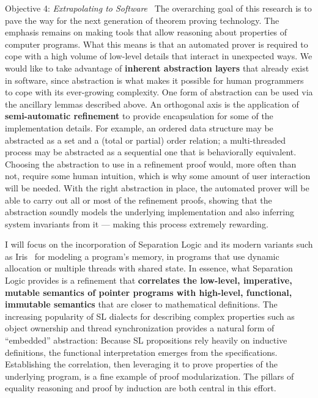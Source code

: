 \begin{paragraph}{Objective 4: {\it Extrapolating to Software}}~
The overarching goal of this research is to pave the way for the next generation of theorem proving technology.
The emphasis remains on making tools that allow reasoning about properties of computer programs.
What this means is that an automated prover is required to cope with a high volume of low-level details that interact in unexpected ways.
We would like to take advantage of \textbf{inherent abstraction layers} that already exist in software,
since abstraction is what makes it possible
for human programmers to cope with its ever-growing complexity.
One form of abstraction can be used via the ancillary lemmas described above.
An orthogonal axis is the application of \textbf{semi-automatic refinement} to provide encapsulation for some of the implementation details.
For example, an ordered data structure may be abstracted as a set and a (total or partial) order relation; a multi-threaded process may be abstracted as a sequential one that is behaviorally equivalent.
Choosing the abstraction to use in a refinement proof would, more often than not, require some human intuition, which is why some amount of user interaction will be needed.
With the right abstraction in place,  the automated prover will be able to carry out all or most of the refinement proofs,
showing that the abstraction soundly models the underlying implementation and also inferring system invariants from it --- making this process extremely rewarding.

I will focus on the incorporation of Separation Logic and its modern variants such as Iris~\cite{iris} for modeling a program's memory, \esp in programs that use dynamic allocation or multiple threads with shared state.
In essence, what Separation Logic provides is a refinement that \textbf{correlates the low-level, imperative, mutable semantics of pointer programs with high-level, functional, immutable semantics} that are closer to mathematical definitions.
The increasing popularity of SL dialects for describing complex properties such as object ownership and thread synchronization provides a natural form of ``embedded'' abstraction:
Because SL propositions rely heavily on inductive definitions, the functional interpretation emerges from the specifications.
Establishing the correlation, then leveraging it to prove properties of the underlying program, is a fine example of proof modularization.
The pillars of equality reasoning and proof by induction are both central in this effort.


\end{paragraph}
